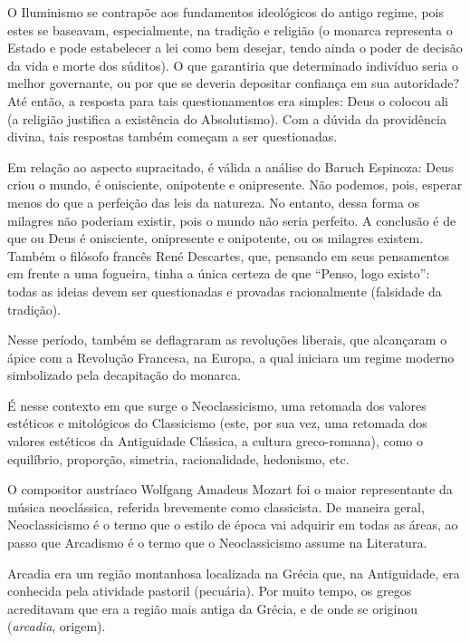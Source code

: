 \documentclass[12pt]{book}
\begin{document}
		\par O Iluminismo se contrapõe aos fundamentos ideológicos do antigo regime, pois estes se baseavam, especialmente, na tradição e religião (o monarca representa o Estado e pode estabelecer a lei como bem desejar, tendo ainda o poder de decisão da vida e morte dos súditos). O que garantiria que determinado indivíduo seria o melhor governante, ou por que se deveria depositar confiança em sua autoridade? Até então, a resposta para tais questionamentos era simples: Deus o colocou ali (a religião justifica a existência do Absolutismo). Com a dúvida da providência divina, tais respostas também começam a ser questionadas.
		\par Em relação ao aspecto supracitado, é válida a análise do Baruch Espinoza: Deus criou o mundo, é onisciente, onipotente e onipresente. Não podemos, pois, esperar menos do que a perfeição das leis da natureza. No entanto, dessa forma os milagres não poderiam existir, pois o mundo não seria perfeito. A conclusão é de que ou Deus é onisciente, onipresente e onipotente, ou os milagres existem. Também o filósofo francês René Descartes, que, pensando em seus pensamentos em frente a uma fogueira, tinha a única certeza de que ``Penso, logo existo'': todas as ideias devem ser questionadas e provadas racionalmente (falsidade da tradição).
		\par Nesse período, também se deflagraram as revoluções liberais, que alcançaram o ápice com a Revolução Francesa, na Europa, a qual iniciara um regime moderno simbolizado pela decapitação do monarca.
		\par É nesse contexto em que surge o Neoclassicismo, uma retomada dos valores estéticos e mitológicos do Classicismo (este, por sua vez, uma retomada dos valores estéticos da Antiguidade Clássica, a cultura greco-romana), como o equilíbrio, proporção, simetria, racionalidade, hedonismo, etc.
		\par O compositor austríaco Wolfgang Amadeus Mozart foi o maior representante da música neoclássica, referida brevemente como classicista. De maneira geral, Neoclassicismo é o termo que o estilo de época vai adquirir em todas as áreas, ao passo que Arcadismo é o termo que o Neoclassicismo assume na Literatura.
		\par Arcadia era um região montanhosa localizada na Grécia que, na Antiguidade, era conhecida pela atividade pastoril (pecuária). Por muito tempo, os gregos acreditavam que era a região mais antiga da Grécia, e de onde se originou (\textit{arcadia}, origem).
		
\end{document}
